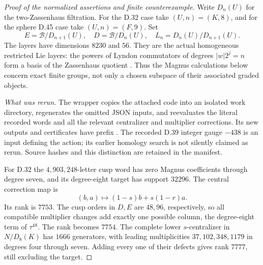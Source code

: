 \begin{proof}[Proof of the normalized assertions and finite counterexample]
Write \(D_n(U)\) for the two-Zassenhaus filtration.
For the D.32 case take \((U,n)=(K,8)\), and for the
sphere D.45 case take \((U,n)=(F,9)\). Set
\[
 E=\mathcal B/D_{n+1}(U),\quad D=\mathcal B/D_n(U),\quad
 L_n=D_n(U)/D_{n+1}(U).
 \tag{C.12a}
\]
The layers have dimensions \(8230\) and \(56\).
They are the actual homogeneous restricted Lie layers:
the powers of Lyndon commutators of degrees
\(\lvert w\rvert 2^j=n\) form a basis of the
Zassenhaus quotient \citep[Proposition 4.4 and its
proof; Corollary 3.4]{cEfrat2023}.
Thus the Magnus calculations below concern exact
finite groups, not only a chosen subspace of their
associated graded objects.

\emph{What was rerun.}
The wrapper  copies
the attached code into an isolated work directory,
regenerates the omitted JSON inputs, and reevaluates
the literal recorded words and all the relevant
centralizer and multiplier corrections. Its new
outputs and certificates have prefix .
The recorded D.39 integer gauge \(-438\) is an input
defining the action; its earlier homology search
is not silently claimed as rerun. Source hashes
and this distinction are retained in the manifest.

For D.32 the \(4{,}903{,}248\)-letter cusp word has
zero Magnus coefficients through degree seven,
and its degree-eight target has support \(32296\).
The central correction map is
\[
 (b,a)\longmapsto(1-s)b+s(1-r)a.
 \tag{C.12b}
\]
Its rank is \(7753\). The cusp orders in \(D,E\)
are \(48,96\), respectively, so all compatible
multiplier changes add exactly one possible
column, the degree-eight term of \(\tau^{48}\).
The rank becomes \(7754\).
The complete lower \(s\)-centralizer in
\(N/D_8(K)\) has \(1666\) generators, with leading
multiplicities \(37,102,348,1179\) in degrees
four through seven. Adding every one of their
defects gives rank \(7777\), still excluding the target.


\end{proof}
